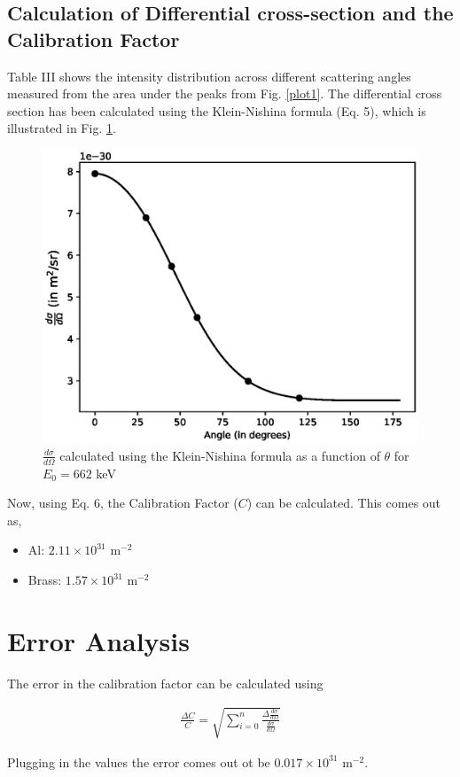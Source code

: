 \subsection{Calculation of Differential cross-section and the Calibration Factor}

Table III shows the intensity distribution across different scattering angles measured from the area under the peaks from Fig. \ref{plot1}. The differential cross section has been calculated using the Klein-Nishina formula (Eq. 5), which is illustrated in Fig. \ref{cross-sec}.\\

\begin{figure}[H]
    \centering
    \includegraphics[width=1\columnwidth]{images/cross-section.eps}
    \caption{$\frac{d\sigma}{d\Omega}$ calculated using the Klein-Nishina formula as a function of $\theta$ for $E_0 = 662$ keV}
    \label{cross-sec}
\end{figure}



Now, using Eq. 6, the Calibration Factor ($C$) can be calculated. This comes out as,

\begin{itemize}
    \item Al: $2.11\times 10^{31}$ m$^{-2}$
    \item Brass: $1.57 \times 10^{31}$ m$^{-2}$
\end{itemize}

\section{Error Analysis}

The error in the calibration factor can be calculated using

\begin{align}
    \frac{\Delta C}{C} = \sqrt{\sum_{i=0}^n \frac{\Delta \frac{d\sigma}{d\Omega}}{\frac{d\sigma}{d\Omega}}}
\end{align}

Plugging in the values the error comes out ot be $0.017 \times 10^{31}$ m$^{-2}$.